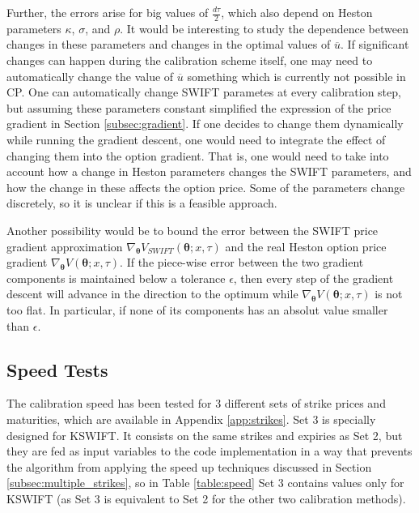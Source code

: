 \documentclass[12,twoside]{mammeTFM}
\theoremstyle{definition}
\theoremstyle{remark}
\begin{document}
Further, the errors arise for big values of $\frac{d \tau}{2}$, which also depend on Heston parameters $\kappa$, $\sigma$, and $\rho$. It would be interesting to study the dependence between changes in these parameters and changes in the optimal values of $\overline{u}$. If significant changes can happen during the calibration scheme itself, one may need to automatically change the value of $\overline{u}$ something which is currently not possible in CP. One can automatically change SWIFT parametes at every calibration step, but assuming these parameters constant simplified the expression of the price gradient in Section \ref{subsec:gradient}. If one decides to change them dynamically while running the gradient descent, one would need to integrate the effect of changing them into the option gradient. That is, one would need to take into account how a change in Heston parameters changes the SWIFT parameters, and how the change in these affects the option price. Some of the parameters change discretely, so it is unclear if this is a feasible approach.

Another possibility would be to bound the error between the SWIFT price gradient approximation $\nabla_{\boldsymbol{\theta}}V_{SWIFT}(\boldsymbol{\theta}; x, \tau)$ and the real Heston option price gradient $\nabla_{\boldsymbol{\theta}}V(\boldsymbol{\theta}; x, \tau)$. If the piece-wise error between the two gradient components is maintained below a tolerance $\epsilon$, then every step of the gradient descent will advance in the direction to the optimum while $\nabla_{\boldsymbol{\theta}}V(\boldsymbol{\theta}; x, \tau)$ is not too flat. In particular, if none of its components has an absolut value smaller than $\epsilon$.

\subsection{Speed Tests}\label{subsec:speed}

The calibration speed has been tested for 3 different sets of strike prices and maturities, which are available in Appendix \ref{app:strikes}. Set 3 is specially designed for KSWIFT. It consists on the same strikes and expiries as Set 2, but they are fed as input variables to the code implementation in a way that prevents the algorithm from applying the speed up techniques discussed in Section \ref{subsec:multiple_strikes}, so in Table \ref{table:speed} Set 3 contains values only for KSWIFT (as Set 3 is equivalent to Set 2 for the other two calibration methods).
\end{document}
